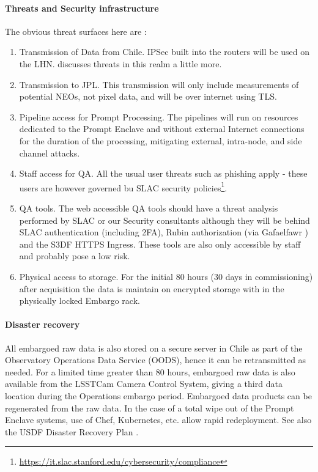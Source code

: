 \paragraph{ Threats and Security infrastructure}
The obvious threat surfaces here are :
\begin{enumerate}
\item Transmission of Data from Chile. IPSec built into the routers will be used on the \gls{LHN}.  discusses threats in this realm a little more.
\item Transmission to \gls{JPL}.  This transmission will only include measurements of potential NEOs, not pixel data, and will be over internet using \gls{TLS}.
\item Pipeline access for Prompt Processing. The pipelines will run on resources dedicated to the Prompt \gls{Enclave} and without external Internet connections for the duration of the processing, mitigating external, intra-node, and side channel attacks.
\item Staff access for \gls{QA}. All the usual user threats such as phishing apply - these users are however governed bu \gls{SLAC} security policies\footnote{\url{https://it.slac.stanford.edu/cybersecurity/compliance}}.
\item QA tools. The web accessible QA tools should have a threat analysis performed by SLAC or our Security consultants although they will be behind SLAC authentication (including 2FA), Rubin authorization (via Gafaelfawr ) and the S3DF HTTPS Ingress. These tools are also only accessible by staff and probably pose a low risk.
\item Physical access to storage.  For the initial 80 hours (30 days in commissioning) after acquisition the data is maintain on encrypted storage with in the physically locked Embargo rack.
\end{enumerate}

\paragraph{Disaster recovery}
All embargoed raw data is also stored on a secure server in Chile as part of the Observatory \gls{Operations} Data Service (OODS), hence it can be retransmitted as needed.
For a limited time greater than 80 hours, embargoed raw data is also available from the LSSTCam \gls{Camera} Control System, giving a third data location during the Operations embargo period.
Embargoed data products can be regenerated from the raw data.
In the case of a total wipe out of the Prompt Enclave systems, use of Chef, \gls{Kubernetes}, etc. allow rapid redeployment.
See also the \gls{USDF} Disaster Recovery Plan .

